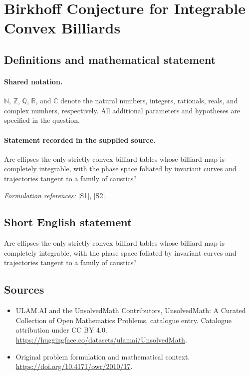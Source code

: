 \documentclass[11pt]{article}
\newcommand{\sref}[2]{\hyperlink{source:#1:#2}{[S#2]}}
\begin{document}
\section{Birkhoff Conjecture for Integrable Convex Billiards}\label{statement}

\subsection{Definitions and mathematical statement}

\paragraph{Shared notation.}$\mathbb N$, $\mathbb Z$, $\mathbb Q$, $\mathbb R$, and $\mathbb C$ denote the natural numbers, integers, rationals, reals, and complex numbers, respectively. All additional parameters and hypotheses are specified in the question.


\paragraph{Statement recorded in the supplied source.}
Are ellipses the only strictly convex billiard tables whose billiard map is completely integrable, with the phase space foliated by invariant curves and trajectories tangent to a family of caustics?
\par\smallskip\textit{Formulation references:} \sref{statement}{1}, \sref{statement}{2}.
\subsection{Short English statement}
Are ellipses the only strictly convex billiard tables whose billiard map is completely integrable, with the phase space foliated by invariant curves and trajectories tangent to a family of caustics?
\subsection{Sources}
\begin{itemize}
\item[\hypertarget{source:statement:1}{S1}] ULAM.AI and the UnsolvedMath Contributors, UnsolvedMath: A Curated Collection of Open Mathematics Problems, catalogue entry. Catalogue attribution under CC BY 4.0.
\url{https://huggingface.co/datasets/ulamai/UnsolvedMath}.
\item[\hypertarget{source:statement:2}{S2}] Original problem formulation and mathematical context.
\url{https://doi.org/10.4171/owr/2010/17}.
\end{itemize}
\label{end:statement}
\end{document}
